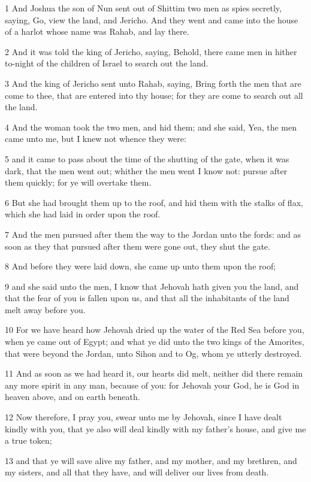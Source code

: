 \par 1 And Joshua the son of Nun sent out of Shittim two men as spies secretly, saying, Go, view the land, and Jericho. And they went and came into the house of a harlot whose name was Rahab, and lay there.
\par 2 And it was told the king of Jericho, saying, Behold, there came men in hither to-night of the children of Israel to search out the land.
\par 3 And the king of Jericho sent unto Rahab, saying, Bring forth the men that are come to thee, that are entered into thy house; for they are come to search out all the land.
\par 4 And the woman took the two men, and hid them; and she said, Yea, the men came unto me, but I knew not whence they were:
\par 5 and it came to pass about the time of the shutting of the gate, when it was dark, that the men went out; whither the men went I know not: pursue after them quickly; for ye will overtake them.
\par 6 But she had brought them up to the roof, and hid them with the stalks of flax, which she had laid in order upon the roof.
\par 7 And the men pursued after them the way to the Jordan unto the fords: and as soon as they that pursued after them were gone out, they shut the gate.
\par 8 And before they were laid down, she came up unto them upon the roof;
\par 9 and she said unto the men, I know that Jehovah hath given you the land, and that the fear of you is fallen upon us, and that all the inhabitants of the land melt away before you.
\par 10 For we have heard how Jehovah dried up the water of the Red Sea before you, when ye came out of Egypt; and what ye did unto the two kings of the Amorites, that were beyond the Jordan, unto Sihon and to Og, whom ye utterly destroyed.
\par 11 And as soon as we had heard it, our hearts did melt, neither did there remain any more spirit in any man, because of you: for Jehovah your God, he is God in heaven above, and on earth beneath.
\par 12 Now therefore, I pray you, swear unto me by Jehovah, since I have dealt kindly with you, that ye also will deal kindly with my father's house, and give me a true token;
\par 13 and that ye will save alive my father, and my mother, and my brethren, and my sisters, and all that they have, and will deliver our lives from death.
